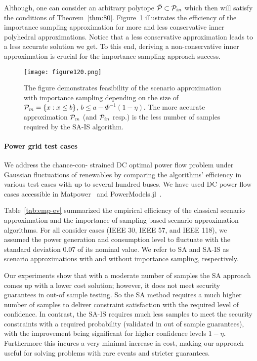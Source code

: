 \documentclass{IEEEtran4PSCC}
\newcommand{\cP}{{\cal P}}
\begin{document}
Although, one can consider an arbitrary polytope $\bar\cP\subset\cP_{in}$ which then will satisfy the conditions of Theorem~\ref{thm:80}. Figure~\ref{fig:80} illustrates the efficiency of the importance sampling approximation for more and less conservative inner polyhedral approximations. 
%
Notice that a less conservative approximation leads to a less accurate solution we get. To this end, deriving a non-conservative inner approximation is crucial for the importance sampling approach success. 


\begin{figure}[!t]
  \centering
  \vspace{-2mm}
  \texttt{[image: figure120.png]}
  \caption{
  The figure demonstrates feasibility of the scenario approximation with importance sampling depending on the size of $\cP_{m}= \{x: x\le b\}$, $b\le a - \Phi^{-1}(1-\eta)$. The more accurate approximation $\cP_m$ (and $\cP_{in}$ resp.) is the less number of samples required by the SA-IS algorithm.}
  \label{fig:80}
  \vspace{-6mm}
\end{figure}


\paragraph{Power grid test cases}

We address the chance-con-
strained DC optimal power flow problem under Gaussian fluctuations of renewables by comparing the algorithms' efficiency in various test cases with up to several hundred buses. We have used DC power flow cases accessible in Matpower~\cite{zimmerman2010matpower}
and PowerModels.jl~\cite{coffrin2018powermodels}.

Table~\ref{tab:emp-ev} summarized the empirical efficiency of the classical scenario approximation and the importance of sampling-based scenario approximation algorithms. For all consider cases (IEEE 30, IEEE 57, and IEEE 118), we assumed the power generation and consumption level to fluctuate with the standard deviation 0.07 of its nominal value. We refer to SA and SA-IS as scenario approximations with and without importance sampling, respectively. 

Our experiments show that with a moderate number of samples the SA approach comes up with a lower cost solution; however, it does not meet security guarantees in out-of sample testing. So the SA method requires a much higher number of samples to deliver constraint satisfaction with the required level of confidence. In contrast, the SA-IS requires much less samples to meet the security constraints with a required probability (validated in out of sample guarantees), with the improvement being significant for higher confidence levels $1-\eta$. Furthermore this incures a very minimal increase in cost, making our approach useful for solving problems with rare events and stricter guarantees. %
\end{document}
